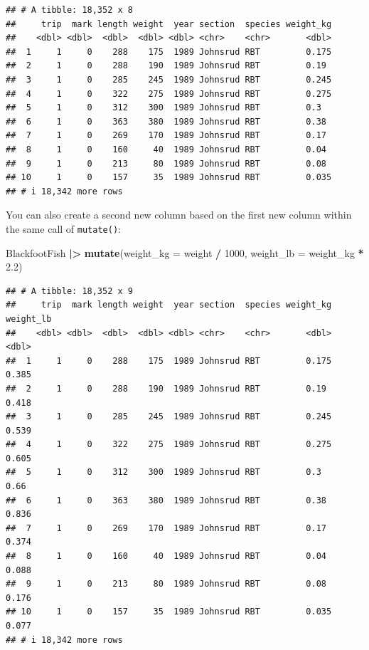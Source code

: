 \documentclass[
  10pt,
  letterpaper,
  twoside,
  openright]{book}
\newenvironment{Shaded}{\begin{snugshade}}{\end{snugshade}}
\newcommand{\AttributeTok}[1]{\textcolor[rgb]{0.13,0.29,0.53}{#1}}
\newcommand{\DecValTok}[1]{\textcolor[rgb]{0.00,0.00,0.81}{#1}}
\newcommand{\FloatTok}[1]{\textcolor[rgb]{0.00,0.00,0.81}{#1}}
\newcommand{\FunctionTok}[1]{\textcolor[rgb]{0.13,0.29,0.53}{\textbf{#1}}}
\newcommand{\NormalTok}[1]{#1}
\newcommand{\SpecialCharTok}[1]{\textcolor[rgb]{0.81,0.36,0.00}{\textbf{#1}}}
\begin{document}
\begin{verbatim}
## # A tibble: 18,352 x 8
##     trip  mark length weight  year section  species weight_kg
##    <dbl> <dbl>  <dbl>  <dbl> <dbl> <chr>    <chr>       <dbl>
##  1     1     0    288    175  1989 Johnsrud RBT         0.175
##  2     1     0    288    190  1989 Johnsrud RBT         0.19 
##  3     1     0    285    245  1989 Johnsrud RBT         0.245
##  4     1     0    322    275  1989 Johnsrud RBT         0.275
##  5     1     0    312    300  1989 Johnsrud RBT         0.3  
##  6     1     0    363    380  1989 Johnsrud RBT         0.38 
##  7     1     0    269    170  1989 Johnsrud RBT         0.17 
##  8     1     0    160     40  1989 Johnsrud RBT         0.04 
##  9     1     0    213     80  1989 Johnsrud RBT         0.08 
## 10     1     0    157     35  1989 Johnsrud RBT         0.035
## # i 18,342 more rows
\end{verbatim}

You can also create a second new column based on the first new column
within the same call of \texttt{mutate()}:

\begin{Shaded}
\begin{Highlighting}[]
\NormalTok{BlackfootFish }\SpecialCharTok{|\textgreater{}}
  \FunctionTok{mutate}\NormalTok{(}\AttributeTok{weight\_kg =}\NormalTok{ weight }\SpecialCharTok{/} \DecValTok{1000}\NormalTok{,}
         \AttributeTok{weight\_lb =}\NormalTok{ weight\_kg }\SpecialCharTok{*} \FloatTok{2.2}\NormalTok{)}
\end{Highlighting}
\end{Shaded}

\begin{verbatim}
## # A tibble: 18,352 x 9
##     trip  mark length weight  year section  species weight_kg weight_lb
##    <dbl> <dbl>  <dbl>  <dbl> <dbl> <chr>    <chr>       <dbl>     <dbl>
##  1     1     0    288    175  1989 Johnsrud RBT         0.175     0.385
##  2     1     0    288    190  1989 Johnsrud RBT         0.19      0.418
##  3     1     0    285    245  1989 Johnsrud RBT         0.245     0.539
##  4     1     0    322    275  1989 Johnsrud RBT         0.275     0.605
##  5     1     0    312    300  1989 Johnsrud RBT         0.3       0.66 
##  6     1     0    363    380  1989 Johnsrud RBT         0.38      0.836
##  7     1     0    269    170  1989 Johnsrud RBT         0.17      0.374
##  8     1     0    160     40  1989 Johnsrud RBT         0.04      0.088
##  9     1     0    213     80  1989 Johnsrud RBT         0.08      0.176
## 10     1     0    157     35  1989 Johnsrud RBT         0.035     0.077
## # i 18,342 more rows
\end{verbatim}
\end{document}
